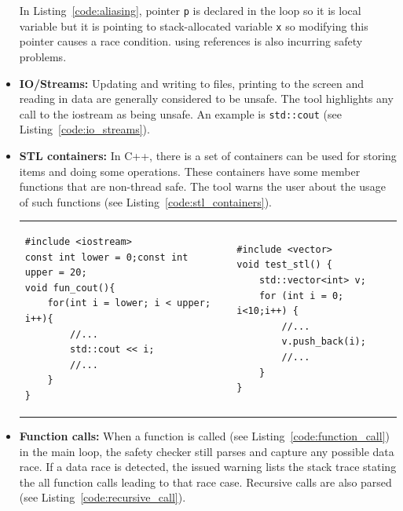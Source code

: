 \begin{itemize}
In Listing~\ref{code:aliasing}, pointer \texttt{p} is declared in the loop so it is local variable but it is pointing to stack-allocated variable \texttt{x} so modifying this pointer causes a race condition. using references is also incurring safety problems.

\item \textbf{IO/Streams:} Updating and writing to files, printing to the screen and reading in data are generally considered to be unsafe. The tool highlights any call to the iostream as being unsafe. An example is \texttt{std::cout} (see Listing~\ref{code:io_streams}).


\item \textbf{STL containers:} In C++, there is a set of containers can be used for storing items and doing some operations. These containers have some member functions that are non-thread safe. The tool warns the user about the usage of such functions (see Listing~\ref{code:stl_containers}).

\begin{tabular}{lll}
\noindent\begin{minipage}{.4\columnwidth}
\begin{lstlisting}[label=code:io_streams,caption={IO/Streams}]
#include <iostream>
const int lower = 0;const int upper = 20;
void fun_cout(){
    for(int i = lower; i < upper; i++){
        //...
        std::cout << i;
        //...
    }
}
\end{lstlisting}
\end{minipage}
&
&
\noindent\begin{minipage}{.4\columnwidth}
\begin{lstlisting}[label=code:stl_containers,caption={STL Containers}]
#include <vector>
void test_stl() {
    std::vector<int> v;
    for (int i = 0; i<10;i++) {
        //...
        v.push_back(i);
        //...
    }
}
\end{lstlisting}
\end{minipage}
\end{tabular}

\item \textbf{Function calls:} When a function is called (see Listing~\ref{code:function_call}) in the main loop, the safety checker still parses and capture any possible data race. If a data race is detected, the issued warning lists the stack trace stating the all function calls leading to that race case. Recursive calls are also parsed (see Listing~\ref{code:recursive_call}).
	
\end{itemize}

